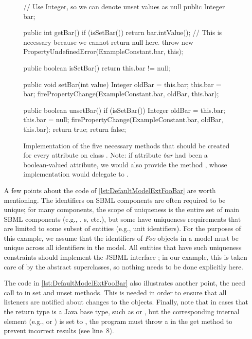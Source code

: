 \begin{figure}[hbt]
  \begin{example}[numbers=left]
// Use Integer, so we can denote unset values as null public Integer bar;

public int getBar() {
  if (isSetBar()) {
    return bar.intValue();
  }
  // This is necessary because we cannot return null here.
  throw new PropertyUndefinedError(ExampleConstant.bar, this);
}

public boolean isSetBar() {
  return this.bar != null;
}

public void setBar(int value) {
  Integer oldBar = this.bar;
  this.bar = bar;
  firePropertyChange(ExampleConstant.bar, oldBar, this.bar);
}

public boolean unsetBar() {
  if (isSetBar()) {
    Integer oldBar = this.bar;
    this.bar = null;
    firePropertyChange(ExampleConstant.bar, oldBar, this.bar);
    return true;
  }
  return false;
}\end{example}
  \caption{Implementation of the five necessary methods that should be
    created for every attribute on class .  Note: if attribute
    \emph{bar} had been a boolean-valued attribute, we would also provide
    the method , whose implementation would delegate to
    .}
  \label{lst:DefaultModelExtFooBar}
\end{figure}

A few points about the code of \vref{lst:DefaultModelExtFooBar} are worth
mentioning.  The identifiers on SBML components are often required to be
unique; for many components, the scope of uniqueness is the entire set of
main SBML components (e.g., \Species, \Compartment{}s, etc.), but some have
uniqueness requirements that are limited to some subset of entities (e.g.,
unit identifiers).  For the purposes of this example, we assume that the
identifiers of \emph{Foo} objects in a model must be unique across all
identifiers in the model.  All entities that have such uniqueness constraints
should implement the JSBML interface \UniqueNamedSBase; in our example, this
is taken care of by the abstract superclasses, so nothing needs to be done
explicitly here.

The code in \vref{lst:DefaultModelExtFooBar} also illustrates
another point, the need call to  in set and
unset methods.  This is needed in order to ensure that all listeners are
notified about changes to the objects.  Finally, note that in cases that
the return type is a Java base type, such as  or ,
but the corresponding internal element (e.g.,  or
) is set to , the program must throw a
 in the get method to prevent incorrect
results (see line~8).

